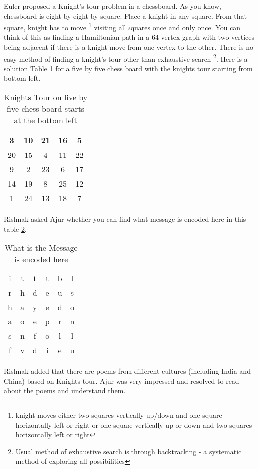 Euler proposed a Knight's tour problem in a chessboard. As you know, chessboard is eight by eight by square. Place a knight in any square. From that square, knight has to move \footnote{knight moves either two squares vertically up/down and one square horizontally left or right or one square vertically up or down and two squares horizontally left or right} visiting all squares once and only once. You can think of this as finding a Hamiltonian path in a 64 vertex graph with two vertices being adjacent if there is a knight move from one vertex to the other. There is no easy method of finding a knight's tour other than exhaustive search \footnote{Usual method of exhaustive search is through backtracking - a systematic method of exploring all possibilities}. Here is a solution Table \ref{5t1} for a five by five chess board with the knights tour starting from bottom left.
\begin{table}
\centering
\begin{tabular}{|c |c |c| c| c|} 
 \hline
3&10&21&16& 5\\
\hline
20&15& 4&11&22\\
\hline
 9& 2&23& 6&17\\
 \hline
14&19& 8&25&12\\
\hline
 1&24&13&18& 7\\
 \hline
\end{tabular}
\caption{Knights Tour on five by five chess board starts at the bottom left}
\label{5t1}
\end{table}
Rishnak asked Ajur whether you can find what message is encoded here in this table \ref{5t2}.
\begin{table}
\centering
\begin{tabular}{c c c c cc}
i& t& t& t& b& l\\
r& h &d &e& u& s\\
h& a& y& e& d& o\\
a& o& e& p& r& n\\
s& n& f& o& l& l\\
f& v& d &i& e& u\\
\end{tabular}
\caption{What is the Message is encoded here}
\label{5t2}
\end{table}
Rishnak added that there are poems from different cultures (including India and China) based on Knights tour. Ajur was very impressed and resolved to read about the poems and understand them. 
